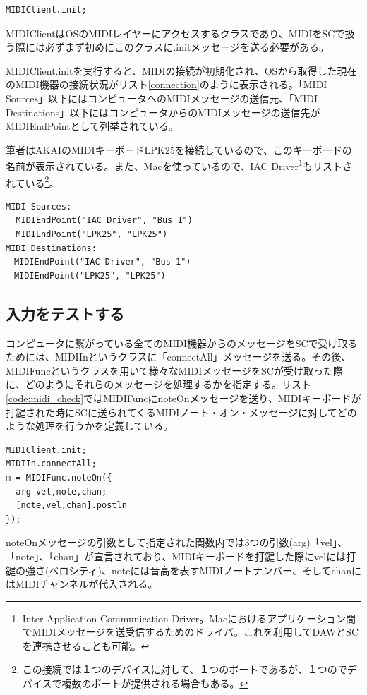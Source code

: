 \documentclass{jsarticle}
\begin{document}
\begin{lstlisting}[caption=MIDIClientの初期化,label=code:init]
MIDIClient.init;
\end{lstlisting}

MIDIClientはOSのMIDIレイヤーにアクセスするクラスであり、MIDIをSCで扱う際には必ずまず初めにこのクラスに.initメッセージを送る必要がある。

MIDIClient.initを実行すると、MIDIの接続が初期化され、OSから取得した現在のMIDI機器の接続状況がリスト\ref{connection}のように表示される。「MIDI Sources」以下にはコンピュータへのMIDIメッセージの送信元、「MIDI Destinations」以下にはコンピュータからのMIDIメッセージの送信先がMIDIEndPointとして列挙されている。

筆者はAKAIのMIDIキーボードLPK25を接続しているので、このキーボードの名前が表示されている。また、Macを使っているので、IAC Driver\footnote{Inter Application Communication Driver。Macにおけるアプリケーション間でMIDIメッセージを送受信するためのドライバ。これを利用してDAWとSCを連携させることも可能。}もリストされている\footnote{この接続では１つのデバイスに対して、１つのポートであるが、１つのでデバイスで複数のポートが提供される場合もある。}。

\begin{lstlisting}[caption=現在接続されているMIDI機器,label=connection]
MIDI Sources:
  MIDIEndPoint("IAC Driver", "Bus 1")
  MIDIEndPoint("LPK25", "LPK25")
MIDI Destinations:
　MIDIEndPoint("IAC Driver", "Bus 1")
　MIDIEndPoint("LPK25", "LPK25")
\end{lstlisting}

\subsection{入力をテストする}
コンピュータに繋がっている全てのMIDI機器からのメッセージをSCで受け取るためには、MIDIInというクラスに「connectAll」メッセージを送る。その後、MIDIFuncというクラスを用いて様々なMIDIメッセージをSCが受け取った際に、どのようにそれらのメッセージを処理するかを指定する。リスト\ref{code:midi_check}ではMIDIFuncにnoteOnメッセージを送り、MIDIキーボードが打鍵された時にSCに送られてくるMIDIノート・オン・メッセージに対してどのような処理を行うかを定義している。

\begin{lstlisting}[caption=MIDI入力の確認,label=code:midi_check]
MIDIClient.init;
MIDIIn.connectAll;
m = MIDIFunc.noteOn({
  arg vel,note,chan;
  [note,vel,chan].postln
});
\end{lstlisting}

noteOnメッセージの引数として指定された関数内では3つの引数(arg)「vel」、「note」、「chan」が宣言されており、MIDIキーボードを打鍵した際にvelには打鍵の強さ(ベロシティ)、noteには音高を表すMIDIノートナンバー、そしてchanにはMIDIチャンネルが代入される。
\end{document}
